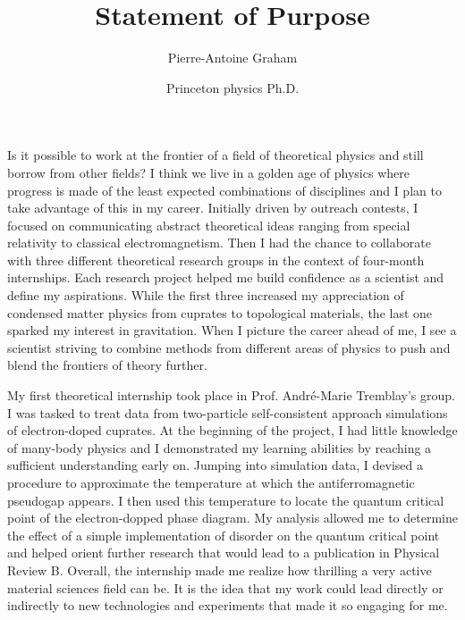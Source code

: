 \documentclass[12pt]{article}
\title{Statement of Purpose}
\author{Pierre-Antoine Graham}
\date{Princeton physics Ph.D.}
\begin{document}
 

\maketitle
\vspace{0.5cm}

Is it possible to work at the frontier of a field of theoretical physics and still borrow from other fields? I think we live in a golden age of physics where progress is made of the least expected combinations of disciplines and I plan to take advantage of this in my career. Initially driven by outreach contests, I focused on communicating abstract theoretical ideas ranging from special relativity to classical electromagnetism. Then I had the chance to collaborate with three different theoretical research groups in the context of four-month internships. Each research project helped me build confidence as a scientist and define my aspirations. While the first three increased my appreciation of condensed matter physics from cuprates to topological materials, the last one sparked my interest in gravitation. When I picture the career ahead of me, I see a scientist striving to combine methods from different areas of physics to push and blend the frontiers of theory further. 
\vspace{0.4cm}

My first theoretical internship took place in Prof. André-Marie Tremblay's group. I was tasked to treat data from two-particle self-consistent approach simulations of electron-doped cuprates. At the beginning of the project, I had little knowledge of many-body physics and I demonstrated my learning abilities by reaching a sufficient understanding early on. Jumping into simulation data, I devised a procedure to approximate the temperature at which the antiferromagnetic pseudogap appears. I then used this temperature to locate the quantum critical point of the electron-dopped phase diagram. My analysis allowed me to determine the effect of a simple implementation of disorder on the quantum critical point and helped orient further research that would lead to a publication in Physical Review B. Overall, the internship made me realize how thrilling a very active material sciences field can be. It is the idea that my work could lead directly or indirectly to new technologies and experiments that made it so engaging for me.\vspace{0.4cm} 
\end{document}
